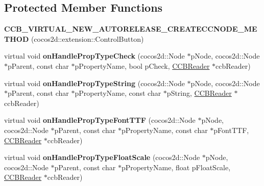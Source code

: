 \subsection*{Protected Member Functions}
\begin{DoxyCompactItemize}
\item 
\mbox{\label{classcocosbuilder_1_1ControlButtonLoader_ae3108b6ff2f642b9e316fd07dd26a712}} 
{\bfseries C\+C\+B\+\_\+\+V\+I\+R\+T\+U\+A\+L\+\_\+\+N\+E\+W\+\_\+\+A\+U\+T\+O\+R\+E\+L\+E\+A\+S\+E\+\_\+\+C\+R\+E\+A\+T\+E\+C\+C\+N\+O\+D\+E\+\_\+\+M\+E\+T\+H\+OD} (cocos2d\+::extension\+::\+Control\+Button)
\item 
\mbox{\label{classcocosbuilder_1_1ControlButtonLoader_a3a264a391493fe914a1db418e0289c05}} 
virtual void {\bfseries on\+Handle\+Prop\+Type\+Check} (cocos2d\+::\+Node $\ast$p\+Node, cocos2d\+::\+Node $\ast$p\+Parent, const char $\ast$p\+Property\+Name, bool p\+Check, \hyperlink{classcocosbuilder_1_1CCBReader}{C\+C\+B\+Reader} $\ast$ccb\+Reader)
\item 
\mbox{\label{classcocosbuilder_1_1ControlButtonLoader_a096e6c19a989e373c6359cfeeae44044}} 
virtual void {\bfseries on\+Handle\+Prop\+Type\+String} (cocos2d\+::\+Node $\ast$p\+Node, cocos2d\+::\+Node $\ast$p\+Parent, const char $\ast$p\+Property\+Name, const char $\ast$p\+String, \hyperlink{classcocosbuilder_1_1CCBReader}{C\+C\+B\+Reader} $\ast$ccb\+Reader)
\item 
\mbox{\label{classcocosbuilder_1_1ControlButtonLoader_a3cc0b2481ff29d5a27f712895478de0a}} 
virtual void {\bfseries on\+Handle\+Prop\+Type\+Font\+T\+TF} (cocos2d\+::\+Node $\ast$p\+Node, cocos2d\+::\+Node $\ast$p\+Parent, const char $\ast$p\+Property\+Name, const char $\ast$p\+Font\+T\+TF, \hyperlink{classcocosbuilder_1_1CCBReader}{C\+C\+B\+Reader} $\ast$ccb\+Reader)
\item 
\mbox{\label{classcocosbuilder_1_1ControlButtonLoader_af500177f0f018db23277b1ed40a1f0c0}} 
virtual void {\bfseries on\+Handle\+Prop\+Type\+Float\+Scale} (cocos2d\+::\+Node $\ast$p\+Node, cocos2d\+::\+Node $\ast$p\+Parent, const char $\ast$p\+Property\+Name, float p\+Float\+Scale, \hyperlink{classcocosbuilder_1_1CCBReader}{C\+C\+B\+Reader} $\ast$ccb\+Reader)

\end{DoxyCompactItemize}
